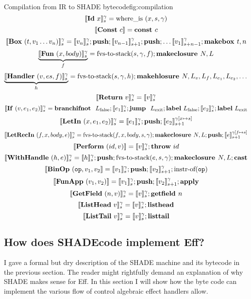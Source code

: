 \documentclass[class=article, crop=false]{standalone}
\begin{document}
\begin{myfigure}[1]{Compilation from IR to SHADE bytecode}{fig:compilation}
    $$ \interp{\irId\ x}_s^\gamma = \text{where\_is}\ (x, s, \gamma) $$
    $$ \interp{\irConst\ c} = \textbf{const } c $$
    $$ \llbracket \mathbf{Box}\ (t, v_1 \dots v_n) \rrbracket_s ^ \gamma = \llbracket v_n \rrbracket_s^\gamma; \textbf{push}; \llbracket v_{n-1} \rrbracket_{s+1}^\gamma; \textbf{push}; \dots \llbracket v_1 \rrbracket_{s+n-1}^\gamma; \textbf{makebox }t, n $$
    $$ \underbrace{\llbracket \mathbf{Fun}\ (x, body) \rrbracket_s ^\gamma }_f = \text{fvs-to-stack} (s, \gamma, f); \textbf{makeclosure }N, L $$
    $$ \underbrace{\llbracket \mathbf{Handler}\ (v, es, f) \rrbracket_s^\gamma}_h = \text{fvs-to-stack} (s, \gamma, h); \textbf{makehlosure }N, L_v, L_f, L_{e_1}, L_{e_2}, \dots $$
    $$ \llbracket \mathbf{Return}\ v \rrbracket_s ^ \gamma =  \llbracket v \rrbracket_s ^ \gamma $$
    $$ \llbracket \mathbf{If}\ (v, e_1, e_2) \rrbracket_s ^ \gamma = \textbf{branchifnot }\ L_\text{false}; \llbracket e_1 \rrbracket_s^\gamma; \textbf{jump }\ L_\text{exit}; \textbf{label}\ L_\text{false}; \llbracket e_2 \rrbracket_s^\gamma; \textbf{label}\ L_\text{exit} $$
    $$ \llbracket \mathbf{LetIn}\ (x, e_1, e_2) \rrbracket_s^\gamma = \llbracket e_1 \rrbracket_s^\gamma; \textbf{push}; \llbracket e_2 \rrbracket_{s+1}^{\gamma[x \mapsto s]} $$
    $$ \llbracket \mathbf{LetRecIn}\ (f, x, body, e) \rrbracket_s^\gamma = \text{fvs-to-stack}(f, x, body, s, \gamma); \textbf{makeclosure }N, L; \textbf{push}; \llbracket e \rrbracket_{s+1}^{\gamma[f \mapsto s]} $$
    $$ \llbracket \mathbf{Perform}\ (id, v) \rrbracket = \llbracket v \rrbracket_s ^ \gamma; \textbf{throw}\ id $$
    $$ \llbracket \mathbf{WithHandle}\ (h, e) \rrbracket_s ^ \gamma = \llbracket h \rrbracket_s ^ \gamma; \textbf{push}; \text{fvs-to-stack}(e, s, \gamma); \textbf{makeclosure }N, L; \mathbf{cast} $$
    $$ \llbracket \mathbf{BinOp}\ (\mathtt{op}, v_1, v_2 \rrbracket = \llbracket v_1 \rrbracket_s ^ \gamma; \textbf{push}; \llbracket v_2 \rrbracket_{s+1}^\gamma; \text{instr-of}(\mathtt{op}) $$
    $$ \llbracket \mathbf{FunApp}\ (v_1, v_2) \rrbracket = \llbracket v_1 \rrbracket_s ^ \gamma; \textbf{push}; \llbracket v_2 \rrbracket_{s+1} ^ \gamma; \textbf{apply} $$
    $$ \llbracket \mathbf{GetField}\ (n, v) \rrbracket_s ^ \gamma = \llbracket v \rrbracket_s ^ \gamma; \textbf{getfield }n $$
    $$ \llbracket \mathbf{ListHead}\ v \rrbracket_s ^ \gamma = \llbracket v \rrbracket_s ^ \gamma; \textbf{listhead} $$
    $$ \llbracket \mathbf{ListTail}\ v \rrbracket_s ^ \gamma = \llbracket v \rrbracket_s ^ \gamma ; \textbf{listtail} $$
\end{myfigure}

\subsection{How does SHADEcode implement Eff?}
\label{sec:shade-illustration}

I gave a formal but dry description of the SHADE machine and its bytecode in the previous section.
The reader might rightfully demand an explanation of why SHADE makes sense for Eff. In this section
I will show how the byte code can implement the various flow of control algebraic effect handlers allow.
\end{document}

